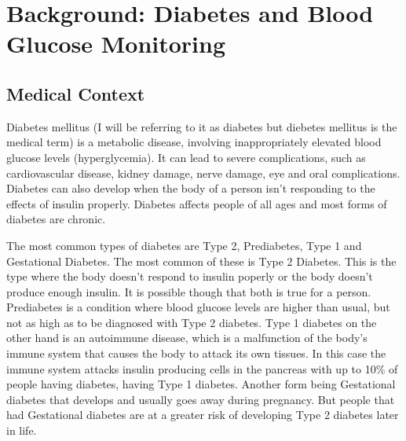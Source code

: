 
\chapter{Background: Diabetes and Blood Glucose Monitoring}
\label{cha:Background Diabetes and Blood Glucose Monitoring}

\section{Medical Context}
\label{sec:Medical context}
Diabetes mellitus (I will be referring to it as diabetes but diebetes mellitus is the medical term) is a metabolic disease, involving inappropriately elevated blood 
glucose levels (hyperglycemia).\cite{sapra_diabetes_2023} It can lead to severe complications, such as cardiovascular disease, kidney damage, nerve damage, 
eye and oral complications.\cite{noauthor_diabetes_2025-1} Diabetes can also develop when the body 
of a person isn’t responding to the effects of insulin properly. Diabetes affects people of all ages and most forms of diabetes are chronic.

The most common types of diabetes are Type 2, Prediabetes, Type 1 and Gestational Diabetes. The most common of these is Type 2 Diabetes. This is the type where the body
doesn't respond to insulin poperly or the body doesn't produce enough insulin. It is possible though that both is true for a person. Prediabetes is a condition where 
blood glucose levels are higher than usual, but not as high as to be diagnosed with Type 2 diabetes.\cite{noauthor_information_2023} Type 1 diabetes on the other hand 
is an autoimmune disease, which is a malfunction of the body's immune system that causes the body to attack its own 
tissues.\cite{noauthor_information_2023, fernandez_autoimmune_2024} In this case the immune system attacks insulin producing cells in the pancreas with up to 10\% of 
people having diabetes, having Type 1 diabetes. Another form being Gestational diabetes that develops and usually goes away during pregnancy. But people that had 
Gestational diabetes are at a greater risk of developing Type 2 diabetes later in life.\cite{noauthor_information_2023}

